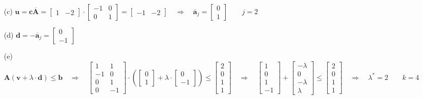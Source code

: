 \begin{itemize}
	\item[(c)] $\mathbf{u}=\mathbf{c\overline{A}}=\begin{bmatrix}1&-2\end{bmatrix}\cdot\begin{bmatrix}-1&0\\0&1\end{bmatrix}=\begin{bmatrix}-1&-2\end{bmatrix}\quad\Rightarrow\quad \mathbf{\overline{a}}_j=\begin{bmatrix}0\\1\end{bmatrix}\qquad j=2$
	\item[(d)] $\mathbf{d}=-\mathbf{\overline{a}}_j=\begin{bmatrix}0\\-1\end{bmatrix}$ 
	\item[(e)] $\mathbf{A}(\mathbf{v}+\lambda\cdot \mathbf{d})\leq \mathbf{b}\quad\Rightarrow\quad\begin{bmatrix}
		1  &  1 \\
		-1 &  0 \\
		 0 &  1 \\
		 0 & -1 
		\end{bmatrix}\cdot\left(\begin{bmatrix}0\\1\end{bmatrix}+\lambda\cdot\begin{bmatrix}0\\-1\end{bmatrix}\right)\leq \begin{bmatrix}
			2\\
			0\\
			1\\
			1
			\end{bmatrix}\quad\Rightarrow\quad\begin{bmatrix}1\\0\\1\\-1\end{bmatrix}+
			\begin{bmatrix}-\lambda\\0\\-\lambda\\\lambda\end{bmatrix}\leq\begin{bmatrix}2\\0\\1\\1\end{bmatrix}\quad\Rightarrow\quad\lambda^*=2\qquad k=4$

\end{itemize}
